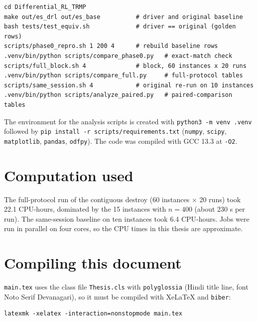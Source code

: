\begin{verbatim}
cd Differential_RL_TRMP
make out/es_drl out/es_base          # driver and original baseline
bash tests/test_equiv.sh             # driver == original (golden rows)
scripts/phase0_repro.sh 1 200 4      # rebuild baseline rows
.venv/bin/python scripts/compare_phase0.py   # exact-match check
scripts/full_block.sh 4              # block, 60 instances x 20 runs
.venv/bin/python scripts/compare_full.py     # full-protocol tables
scripts/same_session.sh 4            # original re-run on 10 instances
.venv/bin/python scripts/analyze_paired.py   # paired-comparison tables
\end{verbatim}

The environment for the analysis scripts is created with \texttt{python3 -m venv .venv} followed by \texttt{pip install -r scripts/requirements.txt} (\texttt{numpy}, \texttt{scipy}, \texttt{matplotlib}, \texttt{pandas}, \texttt{odfpy}). The code was compiled with GCC 13.3 at \texttt{-O2}.

\section{Computation used}

The full-protocol run of the contiguous destroy (60 instances $\times$ 20 runs) took 22.1 CPU-hours, dominated by the 15 instances with $n=400$ (about 230 s per run). The same-session baseline on ten instances took 6.4 CPU-hours. Jobs were run in parallel on four cores, so the CPU times in this thesis are approximate.

\section{Compiling this document}

\texttt{main.tex} uses the class file \texttt{Thesis.cls} with \texttt{polyglossia} (Hindi title line, font Noto Serif Devanagari), so it must be compiled with XeLaTeX and \texttt{biber}:
\begin{verbatim}
latexmk -xelatex -interaction=nonstopmode main.tex
\end{verbatim}
